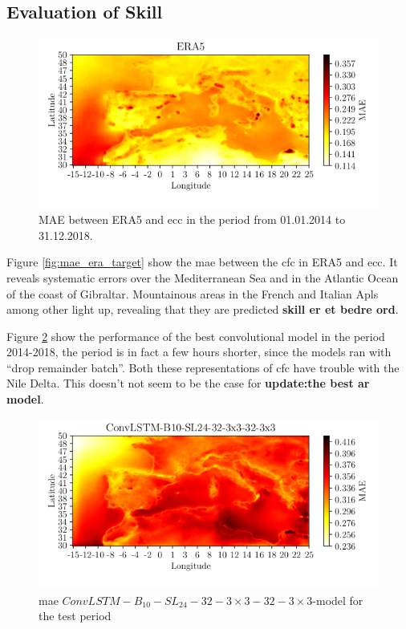 \subsection{Evaluation of Skill}
\begin{figure}
    \centering
    \includegraphics{python_figs/mae_era_vs_target_test_period_2014_to_2018.png}
    \caption{MAE between ERA5 and \acrshort{ecc} in the period from 01.01.2014 to 31.12.2018.}
    \label{fig:MAE_era}
\end{figure}
Figure \ref{fig:mae_era_target} show the \acrshort{mae} between the \acrshort{cfc} in ERA5 and \acrshort{ecc}. It reveals systematic errors over the Mediterranean Sea and in the Atlantic Ocean of the coast of Gibraltar. Mountainous areas in the French and Italian Apls among other light up, revealing that they are predicted \textbf{skill er et bedre ord}. 

Figure \ref{fig:MAE_convlstm} show the performance of the best convolutional model in the period 2014-2018, the period is in fact a few hours shorter, since the models ran with ``drop remainder batch''. Both these representations of \acrshort{cfc} have trouble with the Nile Delta. This doesn't not seem to be the case for \textbf{update:the best ar model}.
\begin{figure}
    \centering
    \includegraphics{python_figs/mae_convlstm_vs_target_test_period_2014_to_2018.png}
    \caption{\acrshort{mae} $ConvLSTM-B_{10}-SL_{24}-32-3\times3-32-3 \times3$-model for the test period }
    \label{fig:MAE_convlstm}
\end{figure}


